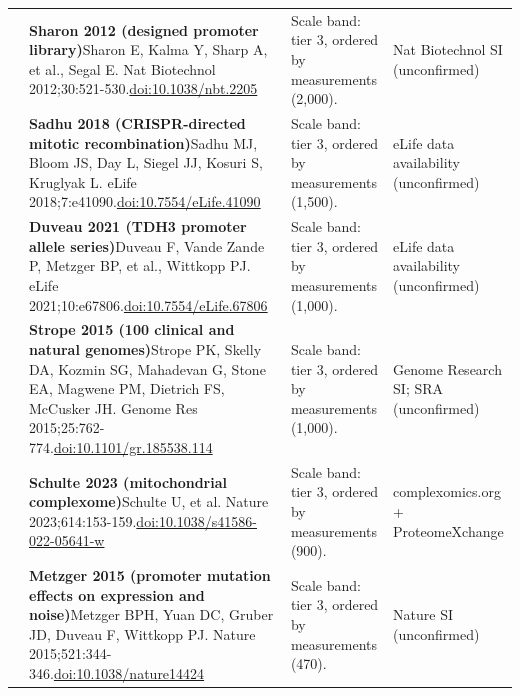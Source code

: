 \begin{landscape}
\begin{longtable}{@{}r@{\hspace{4pt}} L{86mm} L{92mm} L{62mm}@{}}
 & \textbf{Sharon 2012 (designed promoter library)}\newline Sharon E, Kalma Y, Sharp A, et al., Segal E. Nat Biotechnol 2012;30:521-530.\newline \href{https://doi.org/10.1038/nbt.2205}{doi:10.1038/\allowbreak nbt.2205} & Scale band: tier 3, ordered by measurements (2,000). & Nat Biotechnol SI (unconfirmed) \\
 & \textbf{Sadhu 2018 (CRISPR-directed mitotic recombination)}\newline Sadhu MJ, Bloom JS, Day L, Siegel JJ, Kosuri S, Kruglyak L. eLife 2018;7:e41090.\newline \href{https://doi.org/10.7554/eLife.41090}{doi:10.7554/\allowbreak eLife.41090} & Scale band: tier 3, ordered by measurements (1,500). & eLife data availability (unconfirmed) \\
 & \textbf{Duveau 2021 (TDH3 promoter allele series)}\newline Duveau F, Vande Zande P, Metzger BP, et al., Wittkopp PJ. eLife 2021;10:e67806.\newline \href{https://doi.org/10.7554/eLife.67806}{doi:10.7554/\allowbreak eLife.67806} & Scale band: tier 3, ordered by measurements (1,000). & eLife data availability (unconfirmed) \\
 & \textbf{Strope 2015 (100 clinical and natural genomes)}\newline Strope PK, Skelly DA, Kozmin SG, Mahadevan G, Stone EA, Magwene PM, Dietrich FS, McCusker JH. Genome Res 2015;25:762-774.\newline \href{https://doi.org/10.1101/gr.185538.114}{doi:10.1101/\allowbreak gr.185538.114} & Scale band: tier 3, ordered by measurements (1,000). & Genome Research SI; SRA (unconfirmed) \\
 & \textbf{Schulte 2023 (mitochondrial complexome)}\newline Schulte U, et al. Nature 2023;614:153-159.\newline \href{https://doi.org/10.1038/s41586-022-05641-w}{doi:10.1038/\allowbreak s41586-022-05641-w} & Scale band: tier 3, ordered by measurements (900). & complexomics.org + ProteomeXchange \\
 & \textbf{Metzger 2015 (promoter mutation effects on expression and noise)}\newline Metzger BPH, Yuan DC, Gruber JD, Duveau F, Wittkopp PJ. Nature 2015;521:344-346.\newline \href{https://doi.org/10.1038/nature14424}{doi:10.1038/\allowbreak nature14424} & Scale band: tier 3, ordered by measurements (470). & Nature SI (unconfirmed) \\

\end{longtable}
\end{landscape}
